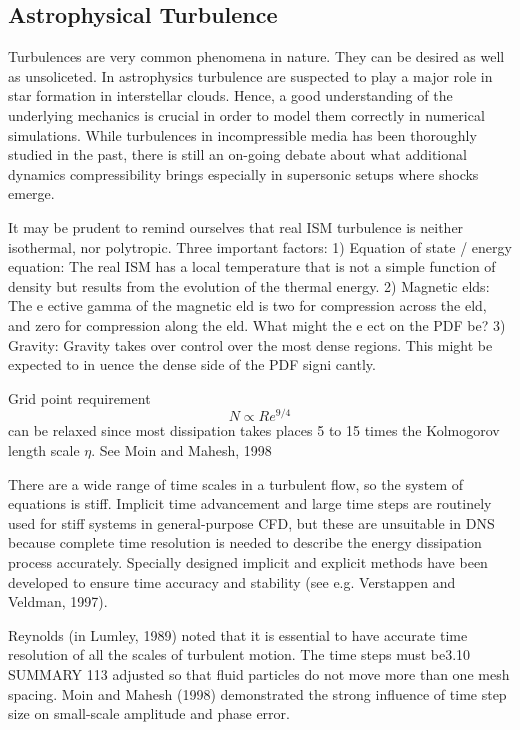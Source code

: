 \subsection{Astrophysical Turbulence}

Turbulences are very common phenomena in nature. They can be desired as well as
unsoliceted. In astrophysics turbulence are suspected to play a major role in
star formation in interstellar clouds. Hence, a good understanding of the
underlying mechanics is crucial in order to model them correctly in numerical
simulations. While turbulences in incompressible media has been thoroughly
studied in the past, there is still an on-going debate about what additional
dynamics compressibility brings especially in supersonic setups where shocks
emerge.

It may be prudent to remind ourselves that real ISM turbulence is
neither isothermal, nor polytropic. Three important factors: 1)
Equation of state / energy equation: The real ISM has a local
temperature that is not a simple function of density but results from
the evolution of the thermal energy. 2) Magnetic elds: The e ective
gamma of the magnetic eld is two for compression across the eld, and
zero for compression along the eld. What might the e ect on the PDF
be? 3) Gravity: Gravity takes over control over the most dense
regions. This might be expected to in uence the dense side of the PDF
signi cantly.

Grid point requirement
\begin{equation}
    N \varpropto Re^{9/4}
\end{equation}
can be relaxed since most dissipation takes places 5 to 15 times the
Kolmogorov length scale $\eta$. See Moin and Mahesh, 1998

There are a wide range of time scales in a turbulent flow, so the system of
equations is stiff. Implicit time advancement and large time steps are
routinely used for stiff systems in general-purpose CFD, but these are
unsuitable in DNS because complete time resolution is needed to describe
the energy dissipation process accurately. Specially designed implicit and
explicit methods have been developed to ensure time accuracy and stability
(see e.g. Verstappen and Veldman, 1997).

Reynolds (in Lumley, 1989) noted that it is essential to have accurate time
resolution of all the scales of turbulent motion. The time steps must be3.10 SUMMARY
113
adjusted so that fluid particles do not move more than one mesh spacing.
Moin and Mahesh (1998) demonstrated the strong influence of time step size
on small-scale amplitude and phase error.


